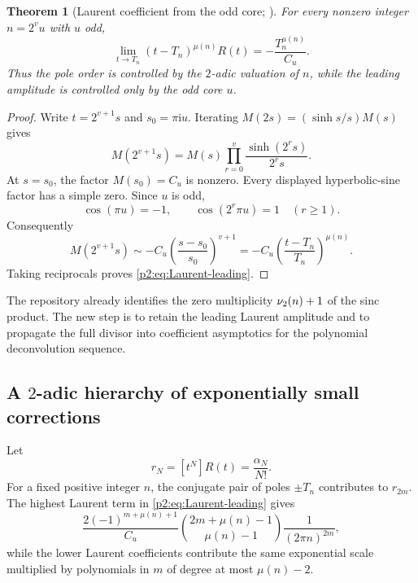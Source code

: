 \documentclass[11pt,oneside]{article}
\numberwithin{equation}{section}
\newtheorem{theorem}{Theorem}[section]
\theoremstyle{definition}
\theoremstyle{remark}
\newcommand{\ii}{\mathrm i}
\begin{document}
\begin{theorem}[Laurent coefficient from the odd core; \statusnew]
\label{p2:thm:Laurent-leading}
For every nonzero integer $n=2^vu$ with $u$ odd,
\begin{equation}
 \boxed{
 \lim_{t\to T_n}(t-T_n)^{\mu(n)}R(t)
 =-\frac{T_n^{\mu(n)}}{C_u}.
 }
 \label{p2:eq:Laurent-leading}
\end{equation}
Thus the pole order is controlled by the $2$-adic valuation of $n$, while the leading amplitude is
controlled only by the odd core $u$.
\end{theorem}

\begin{proof}
Write $t=2^{v+1}s$ and $s_0=\pi\ii u$.  Iterating
$M(2s)=(\sinh s/s)M(s)$ gives
\begin{equation}
 M(2^{v+1}s)=M(s)\prod_{r=0}^{v}\frac{\sinh(2^rs)}{2^rs}.
 \label{p2:eq:M-iterate-pole}
\end{equation}
At $s=s_0$, the factor $M(s_0)=C_u$ is nonzero.  Every displayed hyperbolic-sine factor has a
simple zero.  Since $u$ is odd,
\begin{equation*}
 \cos(\pi u)=-1,
 \qquad
 \cos(2^r\pi u)=1\quad(r\ge1).
\end{equation*}
Consequently
\[
 M(2^{v+1}s)
 \sim -C_u\left(\frac{s-s_0}{s_0}\right)^{v+1}
 =-C_u\left(\frac{t-T_n}{T_n}\right)^{\mu(n)}.
\]
Taking reciprocals proves \eqref{p2:eq:Laurent-leading}.
\end{proof}

\begin{remark}
The repository already identifies the zero multiplicity $\nu_2(n)+1$ of the sinc product.  The new
step is to retain the leading Laurent amplitude and to propagate the full divisor into coefficient
asymptotics for the polynomial deconvolution sequence.
\end{remark}

\subsection{A \texorpdfstring{$2$}{2}-adic hierarchy of exponentially small corrections}

Let
\begin{equation}
 r_N=[t^N]R(t)=\frac{\alpha_N}{N!}.
 \label{p2:eq:rN}
\end{equation}
For a fixed positive integer $n$, the conjugate pair of poles $\pm T_n$ contributes to $r_{2m}$.
The highest Laurent term in \eqref{p2:eq:Laurent-leading} gives
\begin{equation}
 \frac{2(-1)^{m+\mu(n)+1}}{C_u}
 \binom{2m+\mu(n)-1}{\mu(n)-1}
 \frac1{(2\pi n)^{2m}},
 \label{p2:eq:general-shell-leading}
\end{equation}
while the lower Laurent coefficients contribute the same exponential scale multiplied by
polynomials in $m$ of degree at most $\mu(n)-2$.
\end{document}
